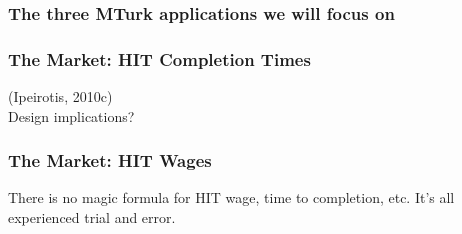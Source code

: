 \documentclass[slides]{beamer} %
\begin{document}
\begin{frame}\frametitle{The three MTurk applications we will focus on}

\begin{minipage}{0.44\linewidth}
\centering

\end{minipage}
\begin{minipage}{0.44\linewidth}
\centering
{}

\end{minipage}

\end{frame}

\begin{frame}\frametitle{The Market: HIT Completion Times}

\centering
(Ipeirotis, 2010c) \\
\vspace{0.5cm} \pause
Design implications?

\end{frame}

\begin{frame}\frametitle{The Market: HIT Wages}

 \pause

\centering
\small
There is no magic formula for HIT wage, time to completion, etc. It's all experienced trial and error. 

\end{frame}
\end{document}
